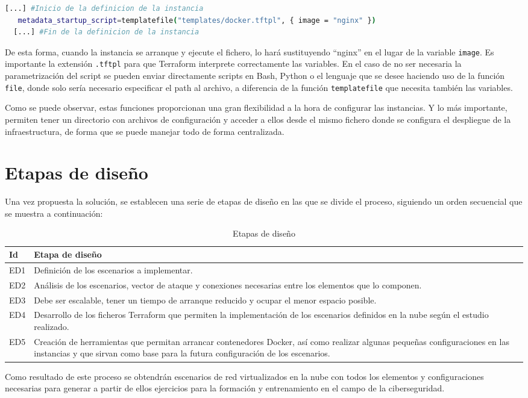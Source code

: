   \begin{lstlisting}[language=Bash, caption=Extracto de fichero de configuración .tf]
  [...] #Inicio de la definicion de la instancia
   metadata_startup_script=templatefile("templates/docker.tftpl", { image = "nginx" })
  [...] #Fin de la definicion de la instancia\end{lstlisting}

  De esta forma, cuando la instancia se arranque y ejecute el fichero, lo hará sustituyendo “nginx” en el lugar de la variable \texttt{image}. Es importante la extensión \texttt{.tftpl} para que Terraform interprete correctamente las variables. En el caso de no ser necesaria la parametrización del script se pueden enviar directamente scripts en Bash, Python o el lenguaje que se desee haciendo uso de la función \texttt{file}, donde solo sería necesario especificar el path al archivo, a diferencia de la función \texttt{templatefile} que necesita también las variables.

  Como se puede observar, estas funciones proporcionan una gran flexibilidad a la hora de configurar las instancias. Y lo más importante, permiten tener un directorio con archivos de configuración y acceder a ellos desde el mismo fichero donde se configura el despliegue de la infraestructura, de forma que se puede manejar todo de forma centralizada.

\section{Etapas de diseño} \label{sec:etp}
Una vez propuesta la solución, se establecen una serie de etapas de diseño en las que se divide el proceso, siguiendo un orden secuencial que se muestra a continuación:


  \begin{table}[h]
    \begin{center}
      \begin{tabular}{ | w{c}{1cm} | m{14cm} | }
        \hline{} \textbf{Id} & \textbf{Etapa de diseño} \\ \hline
        ED1 & Definición de los escenarios a implementar. \\ \hline{}
        ED2 & Análisis de los escenarios, vector de ataque y conexiones necesarias entre los elementos que lo componen. \\ \hline
        ED3 & Debe ser escalable, tener un tiempo de arranque reducido y ocupar el menor espacio posible. \\ \hline{}
        ED4 & Desarrollo de los ficheros Terraform que permiten la implementación de los escenarios definidos en la nube según el estudio realizado.  \\ \hline
        ED5 & Creación de herramientas que permitan arrancar contenedores Docker, así como realizar algunas pequeñas configuraciones en las instancias y que sirvan como base para la futura configuración de los escenarios. \\ \hline
      \end{tabular}
      \caption{Etapas de diseño}
      \label{tab:objs}
    \end{center}
  \end{table}

  Como resultado de este proceso se obtendrán escenarios de red virtualizados en la nube con todos los elementos y configuraciones necesarias para generar a partir de ellos ejercicios para la formación y entrenamiento en el campo de la ciberseguridad.
